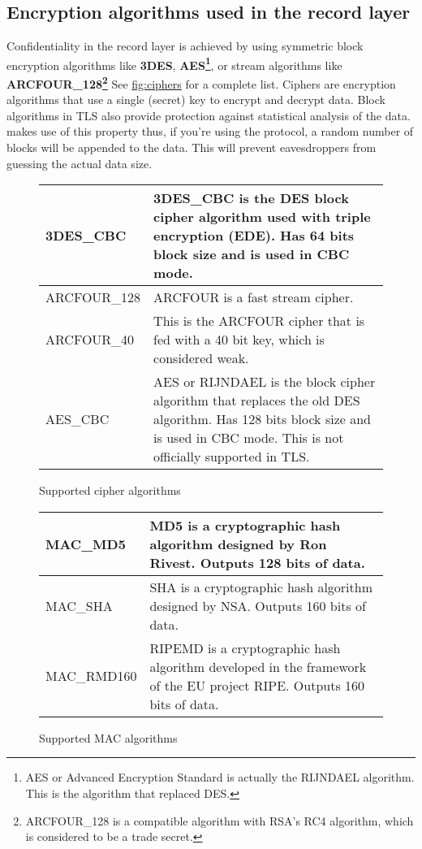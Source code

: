 \subsection{Encryption algorithms used in the record layer}
Confidentiality in the record layer is achieved by using symmetric block 
encryption algorithms like {\bf 3DES}, {\bf AES\footnote{AES or Advanced 
Encryption Standard is actually the RIJNDAEL algorithm. This is the
algorithm that replaced DES.}}, or
stream algorithms like {\bf ARCFOUR\_128\footnote{ARCFOUR\_128 is a compatible
algorithm with RSA's RC4 algorithm, which is considered to be a trade secret.}} See \hyperref{fig:ciphers}{figure }{}{fig:ciphers} for a complete list. 
Ciphers are encryption algorithms that use a single (secret) key
to encrypt and decrypt data. Block algorithms in TLS also provide protection
against statistical analysis of the data. \gnutls{} makes use of this property
thus, if you're using the \tlsI{} protocol, a random number of blocks will be
appended to the data. This will prevent eavesdroppers from guessing the 
actual data size.

\begin{figure}[hbtp]
\begin{tabular}{|l|p{9cm}|}

\hline
3DES\_CBC & 3DES\_CBC is the DES block cipher algorithm used with triple
encryption (EDE). Has 64 bits block size and is used in CBC mode.
\\
\hline
ARCFOUR\_128 & ARCFOUR is a fast stream cipher.
\\
\hline
ARCFOUR\_40 & This is the ARCFOUR cipher that is fed with a 40 bit key,
which is considered weak.
\\
\hline
AES\_CBC & AES or RIJNDAEL is the block cipher algorithm that replaces 
the old DES algorithm. Has
128 bits block size and is used in CBC mode. This is not officially
supported in TLS.
\\
\hline
\end{tabular}
\caption{Supported cipher algorithms}
\label{fig:ciphers}
\end{figure}



\addvspace{1.5cm}

\begin{figure}[hbtp]
\begin{tabular}{|l|p{9cm}|}

\hline
MAC\_MD5 & MD5 is a cryptographic hash algorithm designed by Ron Rivest. Outputs 128 bits of data.
\\
\hline
MAC\_SHA & SHA is a cryptographic hash algorithm designed by NSA. Outputs 160 bits of data.
\\
\hline
MAC\_RMD160 & RIPEMD is a cryptographic hash algorithm developed in the framework
of the EU project RIPE. Outputs 160 bits of data.
\\
\hline
\end{tabular}
\caption{Supported MAC algorithms}
\label{fig:mac}
\end{figure}

